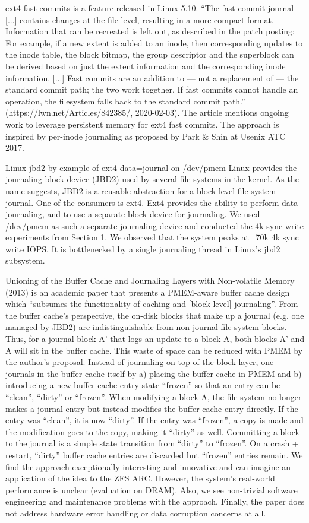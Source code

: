 \documentclass[12pt,a4paper,twoside,draft]{book}
\begin{document}
ext4 fast commits is a feature released in Linux 5.10. “The fast-commit journal [...] contains changes at the file level, resulting in a more compact format. Information that can be recreated is left out, as described in the patch posting: For example, if a new extent is added to an inode, then  corresponding updates to the inode table, the block bitmap, the group descriptor and the superblock can be derived based on just the extent information and the corresponding inode information. [...] Fast commits are an addition to — not a replacement of — the standard commit path; the two work together. If fast commits cannot handle an operation, the filesystem falls back to the standard commit path.” (https://lwn.net/Articles/842385/, 2020-02-03).
The article mentions ongoing work to leverage persistent memory for ext4 fast commits.
The approach is inspired by per-inode journaling as proposed by Park \& Shin at Usenix ATC 2017.

Linux jbd2 by example of ext4 data=journal on /dev/pmem Linux provides the journaling block device (JBD2) used by several file systems in the kernel. As the name suggests, JBD2 is a reusable abstraction for a block-level file system journal. One of the consumers is ext4. Ext4 provides the ability to perform data journaling, and to use a separate block device for journaling. We used /dev/pmem as such a separate journaling device and conducted the 4k sync write experiments from Section 1. We observed that the system peaks at ~70k 4k sync write IOPS. It is bottlenecked by a single journaling thread in Linux’s jbd2 subsystem.

Unioning of the Buffer Cache and Journaling Layers with Non-volatile Memory (2013) is an academic paper that presents a PMEM-aware buffer cache design which “subsumes the functionality of caching and [block-level] journaling”. From the buffer cache’s perspective, the on-disk blocks that make up a journal (e.g. one managed by JBD2) are indistinguishable from non-journal file system blocks. Thus, for a journal block A’ that logs an update to a block A, both blocks A’ and A will sit in the buffer cache. This waste of space can be reduced with PMEM by the author’s proposal. Instead of journaling on top of the block layer, one journals in the buffer cache itself by a) placing the buffer cache in PMEM and b) introducing a new buffer cache entry state “frozen” so that an entry can be “clean”, “dirty” or “frozen”. When modifying a block A, the file system no longer makes a journal entry but instead modifies the buffer cache entry directly. If the entry was “clean”, it is now “dirty”. If the entry was “frozen”, a copy is made and the modification goes to the copy, making it “dirty” as well. Committing a block to the journal is a simple state transition from “dirty” to “frozen”. On a crash + restart, “dirty” buffer cache entries are discarded but “frozen” entries remain.
We find the approach exceptionally interesting and innovative and can imagine an application of the idea to the ZFS ARC. However, the system’s real-world performance is unclear (evaluation on DRAM). Also, we see non-trivial software engineering and maintenance problems with the approach. Finally, the paper does not address hardware error handling or data corruption concerns at all.
\end{document}
